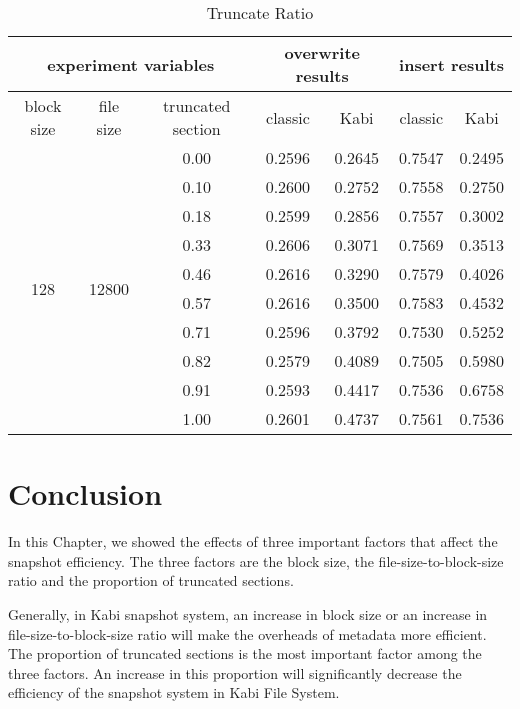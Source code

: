 \begin{table}[t]
\label{tab:truncate_ratio}
\begin{center}
\begin{tabular}{|c|c|c|cccc|}
\hline
\multicolumn{3}{|c|}{experiment variables} & \multicolumn{2}{c|}{overwrite results} & \multicolumn{2}{c|}{insert results}\\
\hline
block size & file size & truncated section & \multicolumn{1}{c|}{classic} & \multicolumn{1}{c|}{Kabi} & \multicolumn{1}{c|}{classic} & Kabi\\
\hline
\multirow{10}{*}{128} & \multirow{10}{*}{12800} & 0.00 & 0.2596 & 0.2645 & 0.7547 & 0.2495 \\
&& 0.10 & 0.2600 & 0.2752 & 0.7558 & 0.2750 \\
&& 0.18 & 0.2599 & 0.2856 & 0.7557 & 0.3002 \\
&& 0.33 & 0.2606 & 0.3071 & 0.7569 & 0.3513 \\
&& 0.46 & 0.2616 & 0.3290 & 0.7579 & 0.4026 \\
&& 0.57 & 0.2616 & 0.3500 & 0.7583 & 0.4532 \\
&& 0.71 & 0.2596 & 0.3792 & 0.7530 & 0.5252 \\
&& 0.82 & 0.2579 & 0.4089 & 0.7505 & 0.5980 \\
&& 0.91 & 0.2593 & 0.4417 & 0.7536 & 0.6758 \\
&& 1.00 & 0.2601 & 0.4737 & 0.7561 & 0.7536 \\
\hline
\end{tabular}
\end{center}
\caption{Truncate Ratio}
\end{table}

\section{Conclusion}

    In this Chapter, we showed the effects of three important factors that affect the snapshot efficiency. The three factors are the block size, the file-size-to-block-size ratio and the proportion of truncated sections.

    Generally, in Kabi snapshot system, an increase in block size or an increase in file-size-to-block-size ratio will make the overheads of metadata more efficient. The proportion of truncated sections is the most important factor among the three factors. An increase in this proportion will significantly decrease the efficiency of the snapshot system in Kabi File System.
